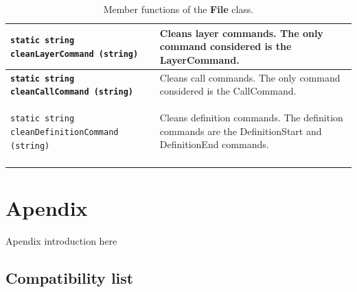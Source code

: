 \documentclass[11pt,twoside,openany,x11names,svgnames]{memoir}
\newcommand\chapterillustration{}
\begin{document}
{\begin{longtable}{| >{\bfseries}p{9.8cm} | p{5.7cm} |}
	\hline
	
	\texttt{static string cleanLayerCommand (string)} & Cleans layer commands. The only command considered is the LayerCommand. \\
	
	\hline
	
	\texttt{static string cleanCallCommand (string)} & Cleans call commands. The only command considered is the CallCommand. \\
	
	\hline
	
	\texttt{static string cleanDefinitionCommand (string)} & Cleans definition commands. The definition commands are the DefinitionStart and DefinitionEnd commands. \\
			
	\hline
\caption{Member functions of the \textbf{File} class.}
\label{tab:File-MemberFunctions}
\end{longtable}
}

\renewcommand\chapterillustration{images/chapter03-cover}
\chapter{Apendix}\label{Apendix}

Apendix introduction here
\newpage 

\section{Compatibility list}\label{Compatibility-list}
\end{document}
